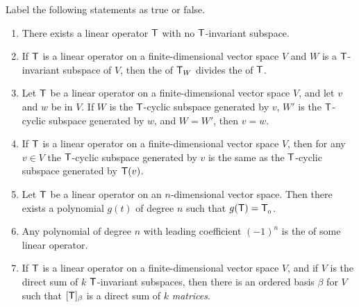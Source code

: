 \exercisesection

\begin{exercise} \label{exercise 5.4.1}
Label the following statements as true or false.
\begin{enumerate}
\item There exists a linear operator \(\textsf{T}\) with no \(\textsf{T}\)-invariant subspace.
\item If \(\textsf{T}\) is a linear operator on a finite-dimensional vector space \(V\) and \(W\) is a \(\textsf{T}\)-invariant subspace of \(V\), then the \CPOLY{} of \(\textsf{T}_W\) divides the \CPOLY{} of \(\textsf{T}\).
\item Let \(\textsf{T}\) be a linear operator on a finite-dimensional vector space \(V\), and let \(v\) and \(w\) be in \(V\).
If \(W\) is the \(\textsf{T}\)-cyclic subspace generated by \(v\), \(W'\) is the \(\textsf{T}\)-cyclic subspace generated by \(w\), and \(W = W'\), then \(v = w\).
\item If \(\textsf{T}\) is a linear operator on a finite-dimensional vector space \(V\), then for any \(v \in V\) the \(\textsf{T}\)-cyclic subspace generated by \(v\) is the same as the \(\textsf{T}\)-cyclic subspace generated by \(\textsf{T}(v)\).
\item Let \(\textsf{T}\) be a linear operator on an \(n\)-dimensional vector space.
Then there exists a polynomial \(g(t)\) of degree \(n\) such that \(g(\textsf{T}) = \textsf{T}_{_0}\).
\item Any polynomial of degree \(n\) with leading coefficient \((-1)^n\) is the \CPOLY{} of some linear operator.
\item If \(\textsf{T}\) is a linear operator on a finite-dimensional vector space \(V\), and if \(V\) is the direct sum of \(k\) \(\textsf{T}\)-invariant subspaces, then there is an ordered basis \(\beta\) for \(V\) such that \([\textsf{T}]_{\beta}\) is a direct sum of \(k\) \emph{matrices}.
\end{enumerate}
\end{exercise}

